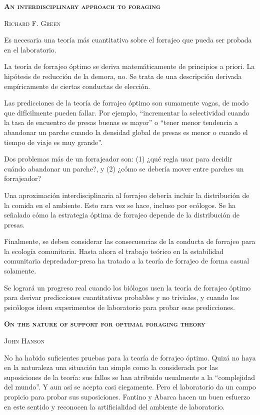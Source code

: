 \documentclass[a4paper,12pt]{article}
\begin{document}
{\scshape\bfseries An interdisciplinary approach to foraging}

{\scshape Richard F. Green}

Es necesaria una teoría más cuantitativa sobre el forrajeo que pueda ser probada en el laboratorio.

La teoría de forrajeo óptimo se deriva matemáticamente de principios a priori. La hipótesis de reducción de la demora, no. Se trata de una descripción derivada empíricamente de ciertas conductas de elección.

Las predicciones de la teoría de forrajeo óptimo son sumamente vagas, de modo que difícilmente pueden fallar. Por ejemplo, ``incrementar la selectividad cuando la tasa de encuentro de presas buenas es mayor'' o ``tener menor tendencia a abandonar un parche cuando la densidad global de presas es menor o cuando el tiempo de viaje es muy grande''.

Dos problemas más de un forrajeador son: (1) ¿qué regla usar para decidir cuándo abandonar un parche?, y (2) ¿cómo se debería mover entre parches un forrajeador? 

Una aproximación interdisciplinaria al forrajeo debería incluir la distribución de la comida en el ambiente. Esto rara vez se hace, incluso por ecólogos. Se ha señalado cómo la estrategia óptima de forrajeo depende de la distribución de presas. 

Finalmente, se deben considerar las consecuencias de la conducta de forrajeo para la ecología comunitaria. Hasta ahora el trabajo teórico en la estabilidad comunitaria depredador-presa ha tratado a la teoría de forrajeo de forma casual solamente. 

Se logrará un progreso real cuando los biólogos usen la teoría de forrajeo óptimo para derivar predicciones cuantitativas probables y no triviales, y cuando los psicólogos ideen experimentos de laboratorio para probar esas predicciones.

{\scshape\bfseries On the nature of support for optimal foraging theory}

{\scshape John Hanson}

No ha habido suficientes pruebas para la teoría de forrajeo óptimo. Quizá no haya en la naturaleza una situación tan simple como la considerada por las suposiciones de la teoría: sus fallos se han atribuido usualmente a la ``complejidad del mundo''. Y aun así se acepta casi ciegamente. Pero el laboratorio da un campo propicio para probar sus suposiciones. Fantino y Abarca hacen un buen esfuerzo en este sentido y reconocen la artificialidad del ambiente de laboratorio. 
\end{document}
